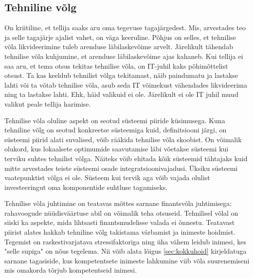 \documentclass{article}
\begin{document}
\subsection{Tehniline võlg}
On kriitiline, et tellija saaks aru oma tegevuse tagajärgedest. Mis, arvestades teo ja selle tagajärje ajalist vahet, on väga keeruline. Põhjus on selles, et tehnilise võla likvideerimine tuleb arenduse läbilaskevõime arvelt. Järelikult tähendab tehnilise võla kuhjumine, et arenduse läbilaskevõime ajas kahaneb. Kui tellija ei saa aru, et tema otsus tekitas tehnilise võla, on IT-juhil kaks põhimõttelist otsust. Ta kas keeldub tehnilist võlga tekitamast, näib paindumatu ja lastakse lahti või ta võtab tehnilise võla, asub seda IT võimekust vähendades likvideerima ning ta lastakse lahti. Ehk, häid valikuid ei ole. Järelikult ei ole IT juhil muud valikut peale tellija harimise.

Tehnilise võla oluline aspekt on seotud süsteemi piiride küsimusega. Kuna tehniline võlg on seotud konkreetse süsteemiga kuid, definitsiooni järgi, on süsteemi piirid alati suvalised, võib rääkida tehnilise võla skoobist. On võimalik olukord, kus lokaalsete optimumide saavutamise läbi võetakse süsteemi kui terviku suhtes tehnilist võlga. Näiteks võib ehitada kõik süsteemid tähtajaks kuid mitte arvestades teiste süsteemi osade integratsioonivajadusi. Üksiku süsteemi vaatepunktist võlga ei ole. Süsteem kui tervik aga võib vajada olulist investeeringut oma komponentide suhtluse tagamiseks. 

Tehnilise võla juhtimine on teatavas mõttes sarnane finantsvõla juhtimisega: rahavoogude nüüdisväärtuse abil on võimalik teha otsuseid. Tehnilisel võlal on siiski ka aspekte, mida lihtsasti finantsmudelisse valada ei õnnestu. Teatavast piirist alates hakkab tehniline võlg takistama värbamist ja inimeste hoidmist. Tegemist on raskestivarjatava stressifaktoriga ning üha vähem leidub inimesi, kes "selle supiga" on nõus tegelema. Nii võib alata lõigus \ref{sec:kokkuhoid} kirjeldatuga sarnane tagasiside, kus kompetentsete inimeste lahkumine viib võla suurenemiseni mis omakorda tõrjub kompetentseid inimesi. 
\end{document}
